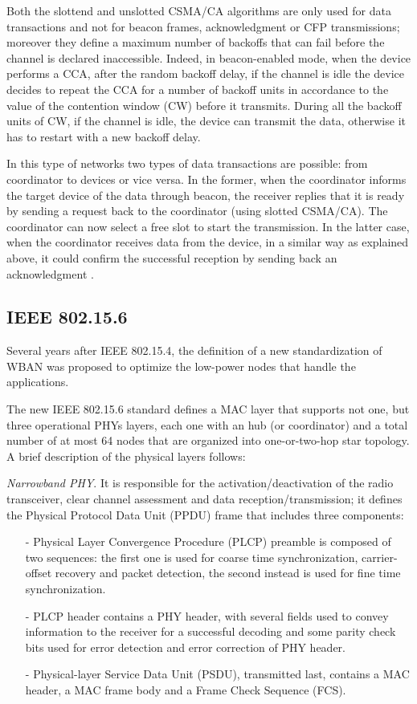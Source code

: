 \documentclass[conference]{IEEEtran}
\begin{document}
Both the slottend and unslotted CSMA/CA algorithms are only used for data transactions and not for beacon frames, acknowledgment or CFP transmissions; moreover they define a maximum number of backoffs that can fail before the channel is declared inaccessible. Indeed, in beacon-enabled mode, when the device performs a CCA, after the random backoff delay, if the channel is idle the device decides to repeat the CCA for a number of backoff units in accordance to the value of the contention window (CW) before it transmits. During all the backoff units of CW, if the channel is idle, the device can transmit the data, otherwise it has to restart with a new backoff delay. 

In this type of networks two types of data transactions are possible: from coordinator to devices or vice versa. In the former, when the coordinator informs the target device of the data through beacon, the receiver replies that it is ready by sending a request back to the coordinator (using slotted CSMA/CA). The coordinator can now select a free slot to start the transmission. In the latter case, when the coordinator receives data from the device, in a similar way as explained above, it could confirm the successful reception by sending back an acknowledgment \cite{li2009performance}.


\subsection{IEEE 802.15.6}
Several years after IEEE 802.15.4, the definition of a new standardization of WBAN was proposed to optimize the low-power nodes that handle the applications.

The new IEEE 802.15.6 standard defines a MAC layer that supports not one, but three operational PHYs layers, each one with an hub (or coordinator) and a total number of at most 64 nodes that are organized into one-or-two-hop star topology. A brief description of the physical layers follows:
\newline

\textit{Narrowband PHY}. It is responsible for the activation/deactivation of the radio transceiver, clear channel assessment and data reception/transmission; it defines the Physical Protocol Data Unit (PPDU) frame that includes three components: 
\begin{itemize}
	\item[-] Physical Layer Convergence Procedure (PLCP) preamble is composed of two sequences: the first one is used for coarse time synchronization, carrier-offset recovery and packet detection, the second instead is used for fine time synchronization.
	\item[-] PLCP header contains a PHY header, with several fields used to convey information to the receiver for a successful decoding and some parity check bits used for error detection and error correction of PHY header.
	\item[-] Physical-layer Service Data Unit (PSDU), transmitted last, contains a MAC header, a MAC frame body and a Frame Check Sequence (FCS).
\end{itemize}
\hfill
\end{document}
